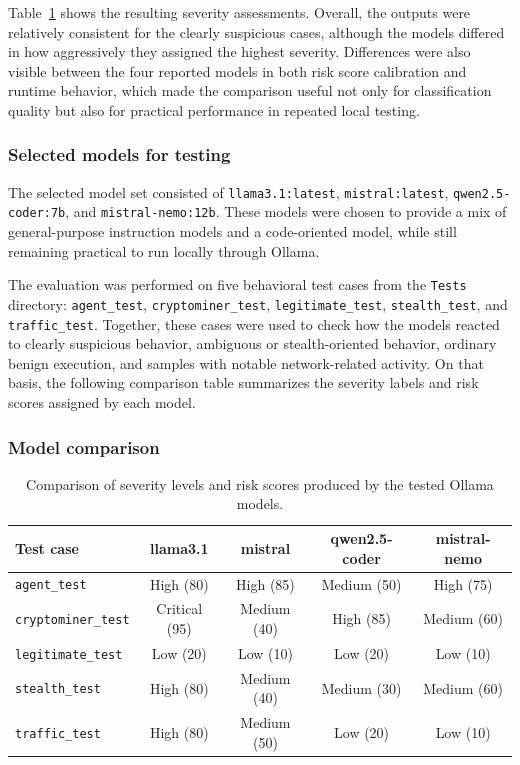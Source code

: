 Table~\ref{tab:ai-agent-severity-comparison} shows the resulting severity assessments. Overall, the outputs were relatively consistent for the clearly suspicious cases, although the models differed in how aggressively they assigned the highest severity. Differences were also visible between the four reported models in both risk score calibration and runtime behavior, which made the comparison useful not only for classification quality but also for practical performance in repeated local testing.

\subsubsection{Selected models for testing}

The selected model set consisted of \texttt{llama3.1:latest}, \texttt{mistral:latest}, \texttt{qwen2.5-coder:7b}, and \texttt{mistral-nemo:12b}. These models were chosen to provide a mix of general-purpose instruction models and a code-oriented model, while still remaining practical to run locally through Ollama.

The evaluation was performed on five behavioral test cases from the \texttt{Tests} directory: \texttt{agent\_test}, \texttt{cryptominer\_test}, \texttt{legitimate\_test}, \texttt{stealth\_test}, and \texttt{traffic\_test}. Together, these cases were used to check how the models reacted to clearly suspicious behavior, ambiguous or stealth-oriented behavior, ordinary benign execution, and samples with notable network-related activity. On that basis, the following comparison table summarizes the severity labels and risk scores assigned by each model.

\subsubsection{Model comparison}

\begin{table}[h]
\centering
\scriptsize
\begin{tabular}{lcccc}
\hline
\textbf{Test case} & \textbf{llama3.1} & \textbf{mistral} & \textbf{qwen2.5-coder} & \textbf{mistral-nemo} \\
\hline
\texttt{agent\_test} & High (80) & High (85) & Medium (50) & High (75) \\
\texttt{cryptominer\_test} & Critical (95) & Medium (40) & High (85) & Medium (60) \\
\texttt{legitimate\_test} & Low (20) & Low (10) & Low (20) & Low (10) \\
\texttt{stealth\_test} & High (80) & Medium (40) & Medium (30) & Medium (60) \\
\texttt{traffic\_test} & High (80) & Medium (50) & Low (20) & Low (10) \\
\hline
\end{tabular}
\caption{Comparison of severity levels and risk scores produced by the tested Ollama models.}
\label{tab:ai-agent-severity-comparison}
\end{table}

